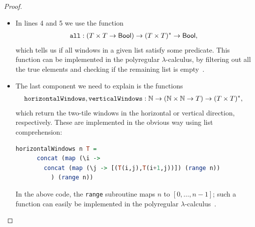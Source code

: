 \documentclass{article}
\begin{document}
\begin{proof}
\begin{itemize}
    represent the designated corner tiles. The program uses also Boolean conjunction \&\& and equality on tiles. These can be implemented, since  the polyregular $\lambda$-calculus can implement any function $A \to B$ where both $A$ and $B$ have finite types. In the same way, we can implement  the functions 
        \begin{align*}
        \mathtt{matchHorizontally}, \mathtt{matchVertically} : T \times T \to \Bool
        \end{align*}
    which check if two windows are matching horizontally or vertically.   
    \item In lines 4 and 5 we use the function 
    \begin{align*}
    \mathtt{all} : (T \times T \to \mathsf{Bool}) \to (T \times T)^* \to \mathsf{Bool},
    \end{align*}
    which tells us if all windows in a given list satisfy some predicate. This function can be implemented in the polyregular $\lambda$-calculus, by filtering out all the true elements
    and checking if the remaining list is empty~\cite[p.~89]{bojanczykPolyregularFunctions2018}.
    
    \item The last component we need to explain is the functions 
    \begin{align*}
    \mathtt{horizontalWindows}, \mathtt{verticalWindows} : {\mathbb N} \to ({\mathbb N} \times {\mathbb N} \to T) \to  (T \times T)^*,
    \end{align*}
    which return the two-tile windows in the horizontal or vertical direction, respectively.
    These are implemented in the obvious way using list comprehension:
    \begin{lstlisting}[language=Haskell]
    horizontalWindows n T =
      concat (map (\i -> 
        concat (map (\j -> [(T(i,j),T(i+1,j))]) (range n))
          ) (range n))
    \end{lstlisting}
    In the above code, the \texttt{range} subroutine maps $n$ to $[0,\ldots,n-1]$; such a function can easily be implemented in the polyregular $\lambda$-calculus~\cite[Example 13]{polyregular-survey}. 
\end{itemize}
\end{proof}
\end{document}
